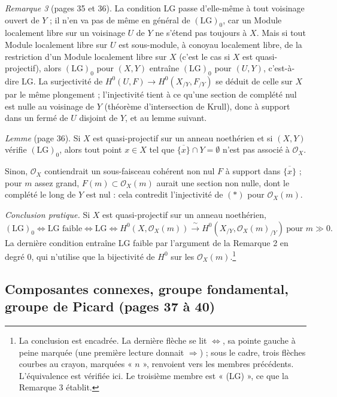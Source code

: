 \documentclass[11pt,a4paper]{article}
\begin{document}
\emph{Remarque 3} (pages 35 et 36). La condition LG passe d'elle-même à tout
voisinage ouvert de $Y$ ; il n'en va pas de même en général de
$(\mathrm{LG})_0$, car un Module localement libre sur un voisinage $U$ de $Y$
ne s'étend pas toujours à $X$. Mais si tout Module localement libre sur $U$
est sous-module, à conoyau localement libre, de la restriction d'un Module
localement libre sur $X$ (c'est le cas si $X$ est quasi-projectif),
alors $(\mathrm{LG})_0$ pour $(X, Y)$ entraîne $(\mathrm{LG})_0$ pour $(U, Y)$,
c'est-à-dire LG. La surjectivité de $H^0(U, F) \to H^0(X_{/Y}, F_{/Y})$ se
déduit de celle sur $X$ par le même plongement ; l'injectivité tient à ce
qu'une section de complété nul est nulle au voisinage de $Y$ (théorème
d'intersection de Krull), donc à support dans un fermé de $U$ disjoint de
$Y$, et au lemme suivant.

\emph{Lemme} (page 36). Si $X$ est quasi-projectif sur un anneau noethérien
et si $(X, Y)$ vérifie $(\mathrm{LG})_0$, alors tout point $x \in X$ tel que
$\overline{\lbrace x \rbrace} \cap Y = \emptyset$ n'est pas associé à
$\mathcal{O}_X$.

Sinon, $\mathcal{O}_X$ contiendrait un sous-faisceau cohérent non nul $F$ à
support dans $\overline{\lbrace x \rbrace}$ ; pour $m$ assez grand, $F(m)
\subset \mathcal{O}_X(m)$ aurait une section non nulle, dont le complété le
long de $Y$ est nul : cela contredit l'injectivité de $(*)$ pour
$\mathcal{O}_X(m)$.

\emph{Conclusion pratique.} Si $X$ est quasi-projectif sur un anneau
noethérien,
\[
  (\mathrm{LG})_0 \iff \text{LG faible} \iff \text{LG} \iff
  H^0(X, \mathcal{O}_X(m)) \xrightarrow{\ \sim\ } H^0(X_{/Y}, \mathcal{O}_X(m)_{/Y})
  \ \text{pour } m \gg 0 .
\]
La dernière condition entraîne LG faible par l'argument de la Remarque 2 en
degré $0$, qui n'utilise que la bijectivité de $H^0$ sur les
$\mathcal{O}_X(m)$.\footnote{La conclusion est encadrée. La dernière flèche se
lit $\Longleftrightarrow$, sa pointe gauche à peine marquée (une première
lecture donnait $\Longrightarrow$) ; sous le cadre, trois flèches courbes au
crayon, marquées « $n$ », renvoient vers les membres précédents.
L'équivalence est vérifiée ici. Le troisième membre est « (LG) », ce que la Remarque 3
établit.}

\subsection*{Composantes connexes, groupe fondamental, groupe de Picard (pages 37 à 40)}
\end{document}
